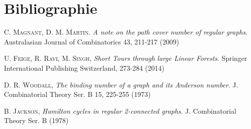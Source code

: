 \documentclass[a4paper]{article}
\theoremstyle{definition}
\theoremstyle{remark}
\begin{document}
\section{Bibliographie}
\begin{thebibliography}{}
     C. \textsc {Magnant}, D. M. \textsc{Martin}. \emph{A note on the path cover number of regular graphs}. Australasian Journal of Combinatorics 43, 211-217 (2009)

 U. \textsc {Feige}, R. \textsc{Ravi}, M. \textsc{Singh}, \emph{Short Tours through large Linear Forests}. Springer International Publishing Switzerland, 273-284 (2014)

 D. R. \textsc {Woodall}, \emph{The binding number of a graph and its Anderson number}. J. Combinatorial Theory Ser. B 15, 225-255 (1973)

 B. \textsc {Jackson}, \emph{Hamilton cycles in regular 2-connected graphs}. J. Combinatorial Theory Ser. B (1978)

\end{thebibliography}
\end{document}

